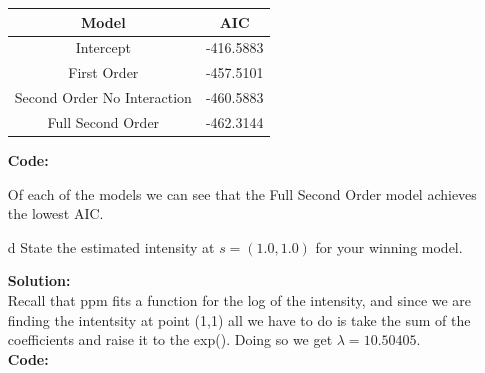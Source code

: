 \documentclass[12pt]{article}
\makeatletter
\theoremstyle{homework}
\newenvironment{exercise}[1]
{\def\@currentlabel{#1}\exercisecore}
{\endexercisecore}
\newcommand{\localhead}[1]{\par\smallskip\noindent\textbf{#1}\nobreak\\}%
\newcommand\solution{\localhead{Solution:}}
\makeatother
\begin{document}
\begin{exercise}{7}
\begin{enumerate}
    \begin{center}
      \begin{tabular}{|c||c| }
        \hline
        Model & AIC \\
        \hline 
        \hline
        Intercept& -416.5883 \\
        First Order& -457.5101  \\
        Second Order No Interaction& -460.5883   \\
        Full Second Order& -462.3144 \\
        \hline
       \end{tabular}
      \end{center}

    \textbf{Code:}
    \begin{center}
    
    \end{center}
    \vspace{.15in}



      Of each of the models we can see that the Full Second Order model achieves the lowest AIC. 









    \vspace{.15in}


    \item[d] State the estimated intensity at $s=(1.0,1.0)$ for your winning model.\\
    \solution Recall that ppm fits a function for the log of the intensity, and since we are finding the intentsity at point (1,1)
    all we have to do is take the sum of the coefficients and raise it to the exp(). Doing so we get $\lambda = 10.50405$. \\
    \textbf{Code:}
    \begin{center}
    
    \end{center}
  \end{enumerate}
  
\end{exercise}
\vspace{.5in}
\end{document}
